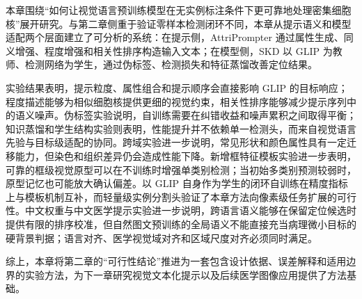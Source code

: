 本章围绕“如何让视觉语言预训练模型在无实例标注条件下更可靠地处理密集细胞核”展开研究。与第二章侧重于验证零样本检测闭环不同，本章从提示语义和模型适配两个层面建立了可分析的系统：在提示侧，AttriPrompter 通过属性生成、同义增强、程度增强和相关性排序构造输入文本；在模型侧，SKD 以 GLIP 为教师、检测网络为学生，通过伪标签、检测损失和特征蒸馏改善定位结果。

实验结果表明，提示粒度、属性组合和提示顺序会直接影响 GLIP 的目标响应；程度描述能够为相似细胞核提供更细的视觉约束，相关性排序能够减少提示序列中的语义噪声。伪标签实验说明，自训练需要在纠错收益和噪声累积之间取得平衡；知识蒸馏和学生结构实验则表明，性能提升并不依赖单一检测头，而来自视觉语言先验与目标级适配的协同。跨域实验进一步说明，常见形状和颜色属性具有一定迁移能力，但染色和组织差异仍会造成性能下降。新增框特征模板实验进一步表明，可靠的框级视觉原型可以在不训练时增强单类别检测；当初始多类别预测较弱时，原型记忆也可能放大确认偏差。以 GLIP 自身作为学生的闭环自训练在精度指标上与模板机制互补，而轻量级实例分割头验证了本章方法向像素级任务扩展的可行性。中文权重与中文医学提示实验进一步说明，跨语言语义能够在保留定位候选时提供有限的排序校准，但自然图文预训练的全局语义不能直接充当病理微小目标的硬背景判据；语言对齐、医学视觉域对齐和区域尺度对齐必须同时满足。

综上，本章将第二章的“可行性结论”推进为一套包含设计依据、误差解释和适用边界的实验方法，为下一章研究视觉文本化提示以及后续医学图像应用提供了方法基础。
